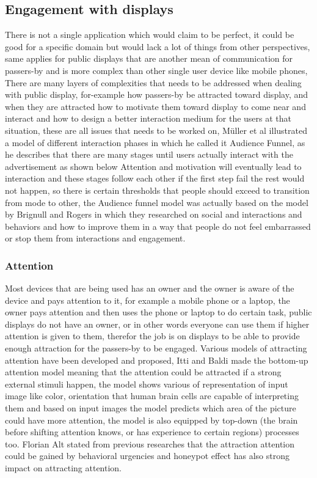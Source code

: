 \subsection{Engagement with displays}
There is not a single application which would claim to be perfect, it could be good for a specific domain but would lack a lot of things from other perspectives, same applies for public displays that are another mean of communication for passers-by and is more complex than other single user device like mobile phones, There are many layers of complexities that needs to be addressed when dealing with public display, for-example how passers-by be attracted toward display, and when they are attracted how to motivate them toward display to come near and interact and how to design a better interaction medium for the users at that situation, these are all issues that needs to be worked on, Müller et al \cite{DesignSpace} illustrated a model of different interaction phases in which he called it Audience Funnel, as he describes that there are many stages until users actually interact with the advertisement as shown below Attention and motivation will eventually lead to interaction and these stages follow each other if the first step fail the rest would not happen, so there is certain thresholds that people should exceed to transition from mode to other, the Audience funnel model was actually based on the model by Brignull and Rogers \cite{ EnticingPeople} in which they researched on social and interactions and behaviors and how to improve them in a way that people do not feel embarrassed or stop them from interactions and engagement. 


\subsubsection{Attention}
Most devices that are being used has an owner and the owner is aware of the device and pays attention to it, for example a mobile phone or a laptop, the owner pays attention and then uses the phone or laptop to do certain task, public displays do not have an owner, or in other words everyone can use them if higher attention is given to them, therefor the job is on displays to be able to provide enough attraction for the passers-by to be engaged. 
Various models of attracting attention have been developed and proposed, Itti and Baldi \cite{attention1} made the bottom-up attention model meaning that the attention could be attracted if a strong external stimuli happen, the model shows various of representation of input image like color, orientation that human brain cells are capable of interpreting them and based on input images the model predicts which area of the picture could have more attention, the model is also equipped by top-down (the brain before shifting attention knows, or has experience to certain regions) processes too.  Florian Alt \cite{pervasiv_ad} stated from previous researches that the attraction attention could be gained by behavioral urgencies and honeypot effect has also strong impact on attracting attention.

